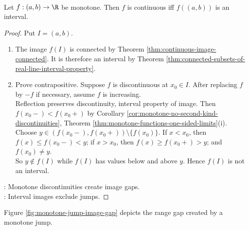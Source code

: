 \begin{theorem} \label{thm:monotone-continuity-interval-image} \\
Let $f:(a,b)\to\R$ be monotone. Then $f$ is continuous iff $f((a,b))$ is an interval.
\begin{proof}
Put $I=(a,b)$.
\begin{enumerate}[label=\roman*.]
\setlength{\itemsep}{0pt}
\item[$(\Rightarrow)$] The image $f(I)$ is connected by Theorem \ref{thm:continuous-image-connected}. It is therefore an interval by Theorem \ref{thm:connected-subsets-of-real-line-interval-property}.
\item[$(\Leftarrow)$] Prove contrapositive. Suppose $f$ is discontinuous at $x_0\in I$. After replacing $f$ by $-f$ if necessary, assume $f$ is increasing.\\
Reflection preserves discontinuity, interval property of image. Then $f(x_0-)<f(x_0+)$ by Corollary \ref{cor:monotone-no-second-kind-discontinuities}, Theorem \ref{thm:monotone-functions-one-sided-limits}(i).\\
Choose $y\in(f(x_0-),f(x_0+))\setminus\{f(x_0)\}$. If $x<x_0$, then $f(x)\leq f(x_0-)<y$; if $x>x_0$, then $f(x)\geq f(x_0+)>y$; and $f(x_0)\neq y$.\\
So $y\notin f(I)$ while $f(I)$ has values below and above $y$. Hence $f(I)$ is not an interval.
\end{enumerate}
: Monotone discontinuities create image gaps.\\
: Interval images exclude jumps.
\end{proof}
\end{theorem}

\noindent Figure \ref{fig:monotone-jump-image-gap} depicts the range gap created by a monotone jump.

\begin{illustrationfigure}[H]
  
  \caption{A jump of an increasing function omits $y\in(f(x_0-),f(x_0+))$ from $f(I)$, so the image is not an interval.}
  \label{fig:monotone-jump-image-gap}
\end{illustrationfigure}

